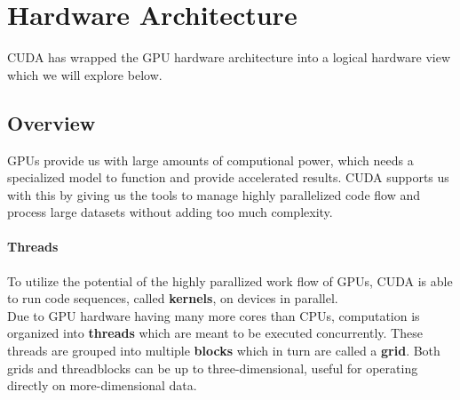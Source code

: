 \section{Hardware Architecture}
\label{sec:hardware}
CUDA has wrapped the GPU hardware architecture into a logical hardware view which we will explore below.\\
\subsection{Overview}
GPUs provide us with large amounts of computional power, which needs a specialized model to function and provide accelerated results.
CUDA supports us with this by giving us the tools to manage highly parallelized code flow and process large datasets without adding too much complexity.

\paragraph{Threads}
To utilize the potential of the highly parallized work flow of GPUs, CUDA is able to run code sequences, called \textbf{kernels}, on devices in parallel.\\
Due to GPU hardware having many more cores than CPUs, computation is organized into \textbf{threads} which are meant to be executed concurrently.
These threads are grouped into multiple \textbf{blocks} which in turn are called a \textbf{grid}.
Both grids and threadblocks can be up to three-dimensional, useful for operating directly on more-dimensional data.\\
